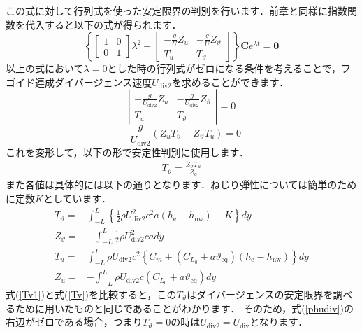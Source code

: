 \documentclass{jarticle}
\begin{document}
この式に対して行列式を使った安定限界の判別を行います．前章と同様に指数関数を代入すると以下の式が得られます．
\begin{equation}
    \left\{
    \begin{bmatrix}
        1 & 0 \\
        0 & 1
    \end{bmatrix}
    \lambda^2
    -
    \begin{bmatrix}
        -\frac{g}{U}Z_u & -\frac{g}{U}Z_\vartheta \\
        T_u & T_\vartheta
    \end{bmatrix}
    \right\}
    \bm{C}e^{\lambda t}
    =
    \bm{0}
\end{equation}
以上の式において$\lambda=0$とした時の行列式がゼロになる条件を考えることで，フゴイド連成ダイバージェンス速度$U_\mathrm{div2}$を求めることができます．
\begin{equation}
    \left|
    \begin{matrix}
        -\frac{g}{U_\mathrm{div2}}Z_u & -\frac{g}{U_\mathrm{div2}}Z_\vartheta \\
        T_u & T_\vartheta
    \end{matrix}
    \right|
    =0
\end{equation}
\begin{equation}
    -\frac{g}{U_\mathrm{div2}} (Z_u T_\vartheta - Z_\vartheta T_u ) = 0
\end{equation}
これを変形して，以下の形で安定性判別に使用します．
\begin{align}\label{phudiv}
    T_\vartheta = \frac{Z_\vartheta T_u}{Z_u}
\end{align}
また各値は具体的には以下の通りとなります．ねじり弾性については簡単のために定数$K$としています．
\begin{align}
    T_\vartheta =& \int_{-L}^{L} \left\{ \frac{1}{2}\rho U_\mathrm{div2}^2 c^2 a  (h_\mathrm{e}-h_\mathrm{nw}) - K \right\} dy \label{Tv1} \\
    Z_\vartheta =& -\int_{-L}^L \frac{1}{2}\rho U_\mathrm{div2}^2 c a dy \\
    T_u =& \int_{-L}^L \rho U_\mathrm{div2} c^2 \left\{ C_m +  (C_{L_0} + a\vartheta_\mathrm{eq})  (h_\mathrm{e}-h_\mathrm{nw}) \right\} dy \\
    Z_u =& -\int_{-L}^L \rho U_\mathrm{div2} c (C_{L_0} + a\vartheta_\mathrm{eq}) dy
\end{align}
式(\ref{Tv1})と式(\ref{Tv})を比較すると，この$T_\vartheta$はダイバージェンスの安定限界を調べるために用いたものと同じであることがわかります．
そのため，式(\ref{phudiv})の右辺がゼロである場合，つまり$T_\vartheta=0$の時は$U_\mathrm{div2}=U_\mathrm{div}$となります．
\end{document}
